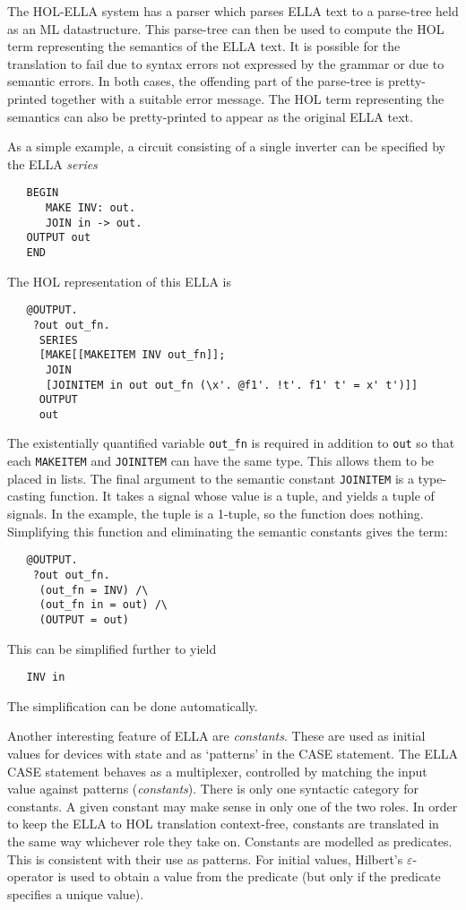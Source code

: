 The HOL-ELLA system has a parser which parses ELLA text to a parse-tree held
as an ML datastructure. This parse-tree can then be used to compute the HOL
term representing the semantics of the ELLA text. It is possible for the
translation to fail due to syntax errors not expressed by the grammar or due
to semantic errors. In both cases, the offending part of the parse-tree is
pretty-printed together with a suitable error message. The HOL term
representing the semantics can also be pretty-printed to appear as the
original ELLA text.

As a simple example, a circuit consisting of a single inverter can be specified
by the ELLA {\it series}
\begin{verbatim}
   BEGIN
      MAKE INV: out.
      JOIN in -> out.
   OUTPUT out
   END
\end{verbatim}
The HOL representation of this ELLA is
\begin{verbatim}
   @OUTPUT.
    ?out out_fn.
     SERIES
     [MAKE[[MAKEITEM INV out_fn]];
      JOIN
      [JOINITEM in out out_fn (\x'. @f1'. !t'. f1' t' = x' t')]]
     OUTPUT
     out
\end{verbatim}
The existentially quantified variable \verb|out_fn| is required in addition to
{\tt out} so that each {\tt MAKEITEM} and {\tt JOINITEM} can have the same
type. This allows them to be placed in lists. The final argument to the
semantic constant {\tt JOINITEM} is a type-casting function. It takes a
signal whose value is a tuple, and yields a tuple of signals. In the example,
the tuple is a 1-tuple, so the function does nothing. Simplifying this
function and eliminating the semantic constants gives the term:
\begin{verbatim}
   @OUTPUT.
    ?out out_fn.
     (out_fn = INV) /\
     (out_fn in = out) /\
     (OUTPUT = out)
\end{verbatim}
This can be simplified further to yield
\begin{verbatim}
   INV in
\end{verbatim}
The simplification can be done automatically.

Another interesting feature of ELLA are {\it constants}. These are used as
initial values for devices with state and as `patterns' in the CASE statement.
The ELLA CASE statement behaves as a multiplexer, controlled by matching the
input value against patterns ({\it constants}). There is only one syntactic
category for constants. A given constant may make sense in only one of the two
roles. In order to keep the ELLA to HOL translation context-free, constants
are translated in the same way whichever role they take on. Constants are
modelled as predicates. This is consistent with their use as patterns. For
initial values, Hilbert's $\varepsilon$-operator is used to obtain a value
from the predicate (but only if the predicate specifies a unique value).

